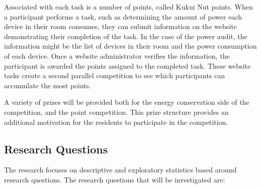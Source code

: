 Associated with each task is a number of points, called Kukui Nut points. When a participant performs a task, such as determining the amount of power each device in their room consumes, they can submit information on the website demonstrating their completion of the task. In the case of the power audit, the information might be the list of devices in their room and the power consumption of each device. Once a website administrator verifies the information, the participant is awarded the points assigned to the completed task. These website tasks create a second parallel competition to see which participants can accumulate the most points.

A variety of prizes will be provided both for the energy conservation side of the competition, and the point competition. This prize structure provides an additional motivation for the residents to participate in the competition.

\subsection{Research Questions}

The research focuses on descriptive and exploratory statistics based around research questions. The research questions that will be investigated are:

